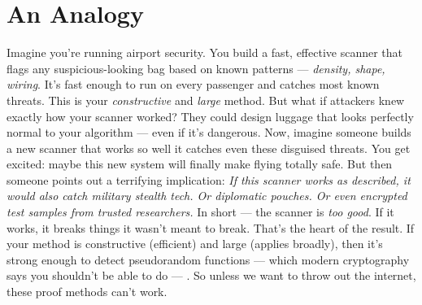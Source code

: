 \documentclass[12pt]{report}
\begin{document}
\section{An Analogy}
Imagine you're running airport security.  
You build a fast, effective scanner that flags any suspicious-looking bag based on known patterns --- \textit{density, shape, wiring}.
It's fast enough to run on every passenger and catches most known threats.
This is your \textit{constructive} and \textit{large} method.
But what if attackers knew exactly how your scanner worked?  
They could design luggage that looks perfectly normal to your algorithm --- even if it's dangerous.
Now, imagine someone builds a new scanner that works so well it catches even these disguised threats.
You get excited: maybe this new system will finally make flying totally safe.
But then someone points out a terrifying implication:  
\textit{If this scanner works as described, it would also catch military stealth tech. Or diplomatic pouches. Or even encrypted test samples from trusted researchers.}
In short --- the scanner is \textit{too good}.  
If it works, it breaks things it wasn't meant to break.
That's the heart of the \cite{razborov1994} result.
If your method is constructive (efficient) and large (applies broadly), then it's strong enough to detect pseudorandom functions --- which modern cryptography says you shouldn't be able to do --- \cite{arora2009}.  
So unless we want to throw out the internet, these proof methods can't work.
\end{document}

